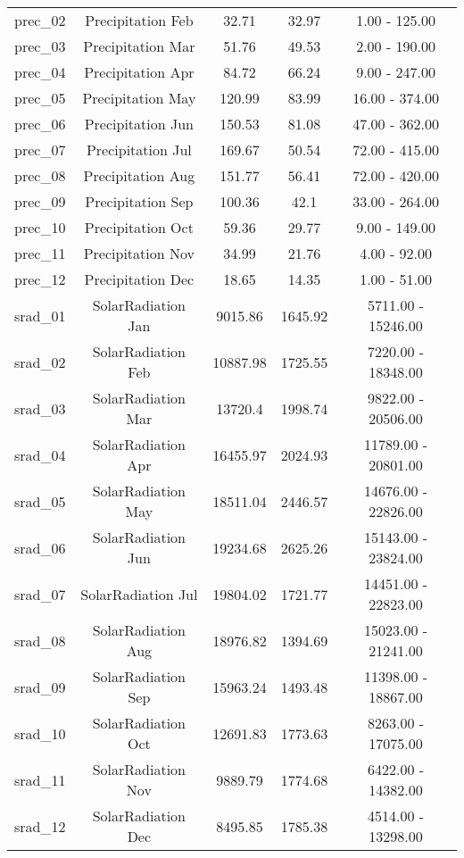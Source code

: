 \begin{table}[H]
\begin{tabular}{lcccc}
			prec\_02 & Precipitation Feb & 32.71 & 32.97 & 1.00 - 125.00 \\
			prec\_03 & Precipitation Mar & 51.76 & 49.53 & 2.00 - 190.00 \\
			prec\_04 & Precipitation Apr & 84.72 & 66.24 & 9.00 - 247.00 \\
			prec\_05 & Precipitation May & 120.99 & 83.99 & 16.00 - 374.00 \\
			prec\_06 & Precipitation Jun & 150.53 & 81.08 & 47.00 - 362.00 \\
			prec\_07 & Precipitation Jul & 169.67 & 50.54 & 72.00 - 415.00 \\
			prec\_08 & Precipitation Aug & 151.77 & 56.41 & 72.00 - 420.00 \\
			prec\_09 & Precipitation Sep & 100.36 & 42.1 & 33.00 - 264.00 \\
			prec\_10 & Precipitation Oct & 59.36 & 29.77 & 9.00 - 149.00 \\
			prec\_11 & Precipitation Nov & 34.99 & 21.76 & 4.00 - 92.00 \\
			prec\_12 & Precipitation Dec & 18.65 & 14.35 & 1.00 - 51.00 \\
			srad\_01 & SolarRadiation Jan & 9015.86 & 1645.92 & 5711.00 - 15246.00 \\
			srad\_02 & SolarRadiation Feb & 10887.98 & 1725.55 & 7220.00 - 18348.00 \\
			srad\_03 & SolarRadiation Mar & 13720.4 & 1998.74 & 9822.00 - 20506.00 \\
			srad\_04 & SolarRadiation Apr & 16455.97 & 2024.93 & 11789.00 - 20801.00 \\
			srad\_05 & SolarRadiation May & 18511.04 & 2446.57 & 14676.00 - 22826.00 \\
			srad\_06 & SolarRadiation Jun & 19234.68 & 2625.26 & 15143.00 - 23824.00 \\
			srad\_07 & SolarRadiation Jul & 19804.02 & 1721.77 & 14451.00 - 22823.00 \\
			srad\_08 & SolarRadiation Aug & 18976.82 & 1394.69 & 15023.00 - 21241.00 \\
			srad\_09 & SolarRadiation Sep & 15963.24 & 1493.48 & 11398.00 - 18867.00 \\
			srad\_10 & SolarRadiation Oct & 12691.83 & 1773.63 & 8263.00 - 17075.00 \\
			srad\_11 & SolarRadiation Nov & 9889.79 & 1774.68 & 6422.00 - 14382.00 \\
			srad\_12 & SolarRadiation Dec & 8495.85 & 1785.38 & 4514.00 - 13298.00 \\

\end{tabular}
\end{table}
